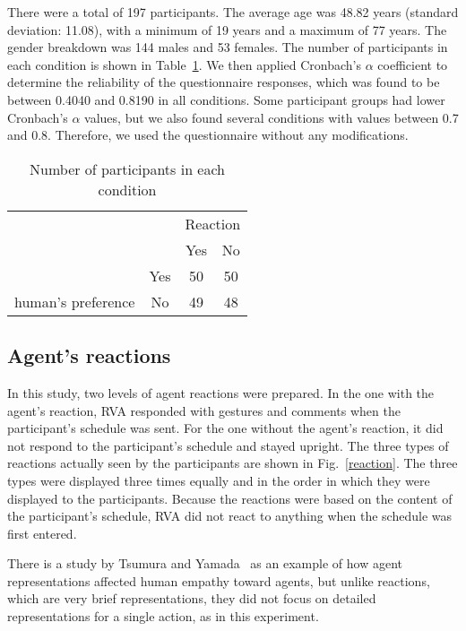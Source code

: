 \documentclass[runningheads]{llncs}
\begin{document}
There were a total of 197 participants. 
The average age was 48.82 years (standard deviation: 11.08), with a minimum of 19 years and a maximum of 77 years.
The gender breakdown was 144 males and 53 females. 
The number of participants in each condition is shown in Table~\ref{table1}.
We then applied Cronbach's $\alpha$ coefficient to determine the reliability of the questionnaire responses, which was found to be between 0.4040 and 0.8190 in all conditions. 
Some participant groups had lower Cronbach's $\alpha$ values, but we also found several conditions with values between 0.7 and 0.8. Therefore, we used the questionnaire without any modifications.

\begin{table}[tbp]
\caption{Number of participants in each condition}
\centering
\begin{tabular}{cc|cc} \hline
 & & \multicolumn{2}{l}{Reaction} \\ \cline{3-4} 
 & & Yes & No \\ \hline
 \multicolumn{1}{l|}{} & Yes & 50 & 50 \\
 \multicolumn{1}{l|}{human's preference} & No & 49 & 48 \\ \hline
\end{tabular}
\label{table1}
\end{table}

\subsection{Agent's reactions}
In this study, two levels of agent reactions were prepared.
In the one with the agent's reaction, RVA responded with gestures and comments when the participant's schedule was sent. 
For the one without the agent's reaction, it did not respond to the participant's schedule and stayed upright. 
The three types of reactions actually seen by the participants are shown in Fig.~\ref{reaction}. 
The three types were displayed three times equally and in the order in which they were displayed to the participants. 
Because the reactions were based on the content of the participant's schedule, RVA did not react to anything when the schedule was first entered.

There is a study by Tsumura and Yamada~\cite{Tsumura23-2} as an example of how agent representations affected human empathy toward agents, but unlike reactions, which are very brief representations, they did not focus on detailed representations for a single action, as in this experiment.
\end{document}
